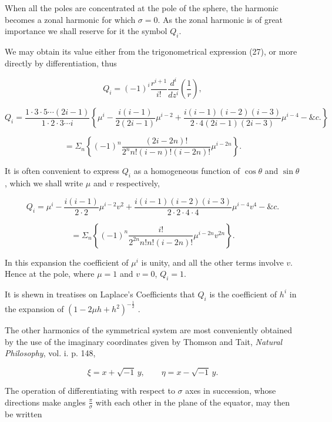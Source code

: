 \documentclass[11pt,a4paper]{article}
\begin{document}
When all the poles are concentrated at the pole of the sphere, the harmonic becomes a zonal harmonic for which $\sigma=0$. As the zonal harmonic is of great importance we shall reserve for it the symbol $Q_i$.

We may obtain its value either from the trigonometrical expression (27), or more directly by differentiation, thus

\begin{equation}\tag{28}
Q_i=(-1)^i\frac{r^{i+1}}{i!}\frac{d^i}{dz^i}\left(\frac{1}{r}\right),
\end{equation}

\[
Q_i=\frac{1\cdot3\cdot5\cdots(2i-1)}{1\cdot2\cdot3\cdots i}
\left\{\mu^i-\frac{i(i-1)}{2(2i-1)}\mu^{i-2}
+\frac{i(i-1)(i-2)(i-3)}{2\cdot4(2i-1)(2i-3)}\mu^{i-4}-\&c.\right\}
\]

\begin{equation}\tag{29}
=\Sigma_n\left\{(-1)^n\frac{(2i-2n)!}{2^n n!(i-n)!(i-2n)!}\mu^{i-2n}\right\}.
\end{equation}

It is often convenient to express $Q_i$ as a homogeneous function of $\cos\theta$ and $\sin\theta$, which we shall write $\mu$ and $v$ respectively,

\[
Q_i=\mu^i-\frac{i(i-1)}{2\cdot2}\mu^{i-2}v^2
+\frac{i(i-1)(i-2)(i-3)}{2\cdot2\cdot4\cdot4}\mu^{i-4}v^4-\&c.
\]

\begin{equation}\tag{30}
=\Sigma_n\left\{(-1)^n\frac{i!}{2^{2n}n!n!(i-2n)!}\mu^{i-2n}v^{2n}\right\}.
\end{equation}

In this expansion the coefficient of $\mu^i$ is unity, and all the other terms involve $v$. Hence at the pole, where $\mu=1$ and $v=0$, $Q_i=1$.

It is shewn in treatises on Laplace's Coefficients that  $Q_i$  is the coefficient of  $h^i$  in the expansion of  $(1-2\mu h + h^2)^{-\frac{1}{2}}$ .

The other harmonics of the symmetrical system are most conveniently obtained by the use of the imaginary coordinates given by Thomson and Tait, \emph{Natural Philosophy}, vol. i. p. 148,

\begin{equation}\tag{31}
\xi=x+\sqrt{-1}\,y,\qquad \eta=x-\sqrt{-1}\,y.
\end{equation}

The operation of differentiating with respect to  $\sigma$  axes in succession, whose directions make angles  $\frac{\pi}{\sigma}$  with each other in the plane of the equator, may then be written
\end{document}
